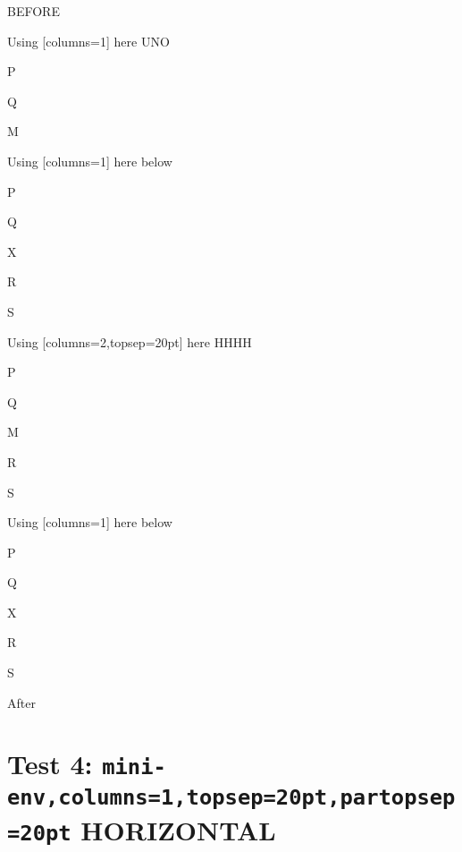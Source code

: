 \documentclass[12pt]{article}
\begin{document}
BEFORE
\begin{enumext}[columns=2]
\item Using [columns=1] here UNO
  \begin{enumext}[columns=1,topsep=20pt]%
     \item  P \item Q \item M %
  \end{enumext}

\item Using [columns=1] here below
\begin{enumext}[columns=1,topsep=20pt]%
     \item  P \item Q \item X  \item R \item S
  \end{enumext}

\columnbreak

\item Using [columns=2,topsep=20pt] here HHHH
  \begin{enumext}[columns=2,topsep=20pt]%
    \item  P \item Q \item M \item R \item S
  \end{enumext}

\item Using [columns=1] here below
\begin{enumext}[columns=1,topsep=20pt]%
     \item  P \item Q \item X  \item R \item S
  \end{enumext}

\end{enumext}
After

\newpage

\section{Test 4: \texttt{mini-env,columns=1,topsep=20pt,partopsep=20pt} HORIZONTAL}
\end{document}
